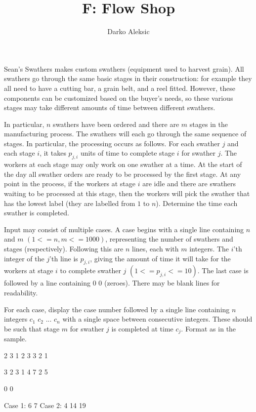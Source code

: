 \documentclass{article}
\title{F: Flow Shop}
\author{Darko Aleksic}
\begin{document}
\begin{problemDescription}
Sean's Swathers makes custom swathers (equipment used to harvest grain). All swathers 
go through the same basic stages in their construction: for example they all need 
to have a cutting bar, a grain belt, and a reel fitted. However, these components can 
be customized based on the buyer's needs, so these various stages may take different 
amounts of time between different swathers.

In particular, $n$ swathers have been ordered and there are $m$ stages in the 
manufacturing process. The swathers will each go through the same sequence of 
stages. In particular, the processing occurs as follows.  For each swather $j$
and each stage $i$, it takes $p_{j,i}$ units of time to complete stage $i$ for 
swather $j$. The workers at each stage may only work on one swather at a time. 
At the start of the day all swather orders are ready to be processed by the first 
stage. At any point in the process, if the workers at stage $i$ are idle and there
are swathers waiting to be processed at this stage, then the workers will pick 
the swather that has the lowest label (they are labelled from $1$ to $n$).
Determine the time each swather is completed.
\end{problemDescription}

\begin{inputDescription}
Input may consist of multiple cases. A case begins with a single line containing 
$n$ and $m$ $(1 <= n,m <= 1000)$, representing the number of swathers and stages 
(respectively). 
Following this are $n$ lines, each with $m$ integers. The $i$’th integer of the 
$j$’th line is $p_{j,i}$, giving the amount of time it will take for the workers 
at stage $i$ to complete swather $j$  $(1 <= p_{j,i} <= 10)$.  The last case is followed
by a line containing 0 0 (zeroes).  There may be blank lines for readability.
\end{inputDescription}

\begin{outputDescription}
For each case, display the case number followed by a single line containing $n$
integers $c_{1}$ $c_{2}$ ... $c_{n}$ with a single space between consecutive integers.
These should be such that stage $m$ for swather $j$ is completed at time $c_{j}$.
Format as in the sample.
\end{outputDescription}

\begin{sampleInput}
2 3
1 2 3
3 2 1

3 2
3 1
4 7
2 5

0 0
\end{sampleInput}
\begin{sampleOutput}
Case 1: 6 7
Case 2: 4 14 19
\end{sampleOutput}
\end{document}
